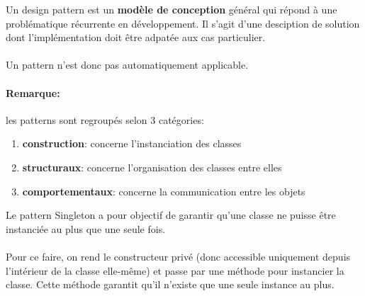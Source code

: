 \item{}
{\faux}
{Un design pattern est un \textbf{modèle de conception} général qui répond à une problématique récurrente en développement. Il s'agit d'une desciption de solution dont l'implémentation doit être adpatée aux cas particulier.
\paragraph{}Un pattern n'est donc pas automatiquement applicable.

\paragraph{Remarque:} les patterns sont regroupés selon 3 catégories:
\begin{enumerate}
\item \textbf{construction}: concerne l'instanciation des classes
\item \textbf{structuraux}: concerne l'organisation des classes entre elles
\item \textbf{comportementaux}: concerne la communication entre les objets
\end{enumerate}
}


\item{}
{\faux}
{Le pattern Singleton a pour objectif de garantir qu'une classe ne puisse être instanciée au plus que une seule fois.
\paragraph{}
Pour ce faire, on rend le constructeur privé (donc accessible uniquement depuis l'intérieur de la classe elle-même) et passe par une méthode pour instancier la classe. Cette méthode garantit qu'il n'existe que une seule instance au plus.
}



